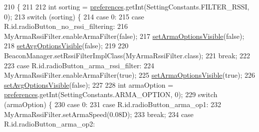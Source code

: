 \begin{DoxyCode}
210                                  \{
211 
212         \textcolor{keywordtype}{int} sorting = \hyperlink{classit_1_1unibo_1_1torsello_1_1bluetoothpositioning_1_1activities_1_1ApplicationActivity_a3ee672ef79c268d0618ff3276c2e85f0_a3ee672ef79c268d0618ff3276c2e85f0}{preferences}.getInt(SettingConstants.FILTER\_RSSI, 0);
213         \textcolor{keywordflow}{switch} (sorting) \{
214             \textcolor{keywordflow}{case} 0:
215             \textcolor{keywordflow}{case} R.id.radioButton\_no\_rssi\_filtering:
216                 MyArmaRssiFilter.enableArmaFilter(\textcolor{keyword}{false});
217                 \hyperlink{classit_1_1unibo_1_1torsello_1_1bluetoothpositioning_1_1activities_1_1ApplicationActivity_a53f68b9ea3a7805d43d4d2c84a920871_a53f68b9ea3a7805d43d4d2c84a920871}{setArmaOptionsVisible}(\textcolor{keyword}{false});
218                 \hyperlink{classit_1_1unibo_1_1torsello_1_1bluetoothpositioning_1_1activities_1_1ApplicationActivity_ab50a70cb5d2d98211598b297a10bc44f_ab50a70cb5d2d98211598b297a10bc44f}{setAvgOptionsVisible}(\textcolor{keyword}{false});
219 
220                 BeaconManager.setRssiFilterImplClass(MyArmaRssiFilter.class);
221                 \textcolor{keywordflow}{break};
222 
223             \textcolor{keywordflow}{case} R.id.radioButton\_arma\_rssi\_filter:
224                 MyArmaRssiFilter.enableArmaFilter(\textcolor{keyword}{true});
225                 \hyperlink{classit_1_1unibo_1_1torsello_1_1bluetoothpositioning_1_1activities_1_1ApplicationActivity_a53f68b9ea3a7805d43d4d2c84a920871_a53f68b9ea3a7805d43d4d2c84a920871}{setArmaOptionsVisible}(\textcolor{keyword}{true});
226                 \hyperlink{classit_1_1unibo_1_1torsello_1_1bluetoothpositioning_1_1activities_1_1ApplicationActivity_ab50a70cb5d2d98211598b297a10bc44f_ab50a70cb5d2d98211598b297a10bc44f}{setAvgOptionsVisible}(\textcolor{keyword}{false});
227 
228                 \textcolor{keywordtype}{int} armaOption = \hyperlink{classit_1_1unibo_1_1torsello_1_1bluetoothpositioning_1_1activities_1_1ApplicationActivity_a3ee672ef79c268d0618ff3276c2e85f0_a3ee672ef79c268d0618ff3276c2e85f0}{preferences}.getInt(SettingConstants.ARMA\_OPTION, 0);
229                 \textcolor{keywordflow}{switch} (armaOption) \{
230                     \textcolor{keywordflow}{case} 0:
231                     \textcolor{keywordflow}{case} R.id.radioButton\_arma\_op1:
232                         MyArmaRssiFilter.setArmaSpeed(0.08D);
233                         \textcolor{keywordflow}{break};
234                     \textcolor{keywordflow}{case} R.id.radioButton\_arma\_op2:

\end{DoxyCode}
